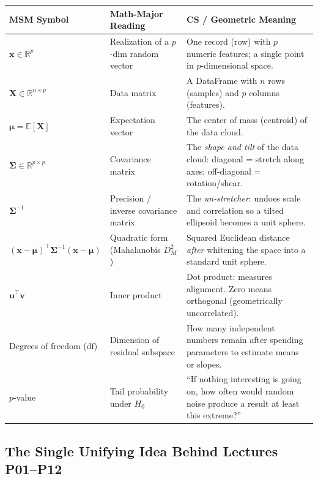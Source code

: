 \documentclass[11pt, a4paper]{article}
\begin{document}
\begin{table}[h!]
\centering
\small
\begin{tabularx}{\textwidth}{>{\raggedright\arraybackslash}p{3.0cm} >{\raggedright\arraybackslash}p{4.3cm} >{\raggedright\arraybackslash}X}
\toprule
\textbf{MSM Symbol} & \textbf{Math-Major Reading} & \textbf{CS / Geometric Meaning} \\
\midrule
$\mathbf{x} \in \mathbb{R}^p$ & Realization of a $p$-dim random vector & One record (row) with $p$ numeric features; a single point in $p$-dimensional space. \\
$\mathbf{X} \in \mathbb{R}^{n \times p}$ & Data matrix & A DataFrame with $n$ rows (samples) and $p$ columns (features). \\
$\boldsymbol{\mu} = \mathbb{E}[\mathbf{X}]$ & Expectation vector & The center of mass (centroid) of the data cloud. \\
$\boldsymbol{\Sigma} \in \mathbb{R}^{p \times p}$ & Covariance matrix & The \emph{shape and tilt} of the data cloud: diagonal = stretch along axes; off-diagonal = rotation/shear. \\
$\boldsymbol{\Sigma}^{-1}$ & Precision / inverse covariance matrix & The \emph{un-stretcher}: undoes scale and correlation so a tilted ellipsoid becomes a unit sphere. \\
$(\mathbf{x}-\boldsymbol{\mu})^\top \boldsymbol{\Sigma}^{-1}(\mathbf{x}-\boldsymbol{\mu})$ & Quadratic form (Mahalanobis $D_M^2$) & Squared Euclidean distance \emph{after} whitening the space into a standard unit sphere. \\
$\mathbf{u}^\top \mathbf{v}$ & Inner product & Dot product: measures alignment. Zero means orthogonal (geometrically uncorrelated). \\
Degrees of freedom ($\text{df}$) & Dimension of residual subspace & How many independent numbers remain after spending parameters to estimate means or slopes. \\
$p$-value & Tail probability under $H_0$ & ``If nothing interesting is going on, how often would random noise produce a result at least this extreme?'' \\
\bottomrule
\end{tabularx}
\end{table}

\subsection{The Single Unifying Idea Behind Lectures P01--P12}
\end{document}
